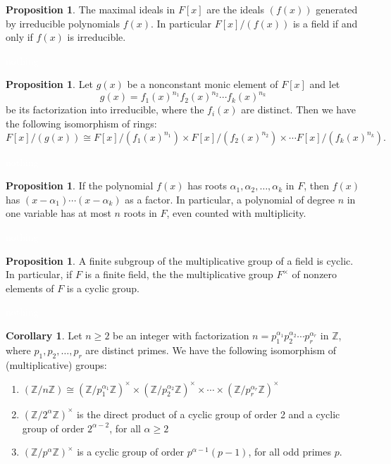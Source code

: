 \documentclass{article}
\theoremstyle{definition}
\newtheorem{prop}[thm]{Proposition}
\newtheorem{cor}[thm]{Corollary}
\newcommand{\nl}{\textcolor{white}{nothing}}
\newcommand{\Z}{\mathbb{Z}}
\newcommand{\al}{\alpha}
\begin{document}
\begin{prop}
The maximal ideals in $F[x]$ are the ideals $(f(x))$ generated by irreducible polynomials $f(x)$. In particular $F[x]/ (f(x))$ is a field if and only if $f(x)$ is irreducible.
\end{prop}

\nl

\begin{prop}
Let $g(x)$ be a nonconstant monic element of $F[x]$ and let
\[g(x) = f_1(x)^{n_1}f_2(x)^{n_2}\cdots f_k(x)^{n_k}\]
be its factorization into irreducible, where the $f_i(x)$ are distinct. Then we have the following isomorphism of rings:
\[F[x]/(g(x)) \cong F[x]/ (f_1(x)^{n_1}) \times F[x]/ (f_2(x)^{n_2}) \times \cdots F[x]/ (f_k(x)^{n_k}).\]
\end{prop}

\nl

\begin{prop}
If the polynomial $f(x)$ has roots $\al_1,\al_2,\ldots,\al_k$ in $F$, then $f(x)$ has $(x-\al_1)\cdots (x-\al_k)$ as a factor. In particular, a polynomial of degree $n$ in one variable has at most $n$ roots in $F$, even counted with multiplicity.
\end{prop}

\nl

\begin{prop}
A finite subgroup of the multiplicative group of a field is cyclic. In particular, if $F$ is a finite field, the the multiplicative group $F^\times$ of nonzero elements of $F$ is a cyclic group.
\end{prop}

\nl

\begin{cor}
Let $n\geq 2$ be an integer with factorization $n = p_1^{\al_1}p_2^{\al_2}\cdots p_r^{\al_r}$ in $\Z$, where $p_1,p_2,\ldots,p_r$ are distinct primes. We have the following isomorphism of (multiplicative) groups:
\begin{enumerate}
\item $(\Z/n\Z)\cong (\Z/p_1^{\al_1}\Z)^\times \times (\Z/p_2^{\al_2}\Z)^\times \times \cdots \times(\Z/p_r^{\al_r}\Z)^\times$
\item $(\Z/2^\al \Z)^\times$ is the direct product of a cyclic group of order 2 and a cyclic group of order $2^{\al -2}$, for all $\al \geq 2$
\item $(\Z/p^\al \Z)^\times$ is a cyclic group of order $p^{\al -1}(p-1)$, for all odd primes $p$.
\end{enumerate}
\end{cor}
\end{document}

